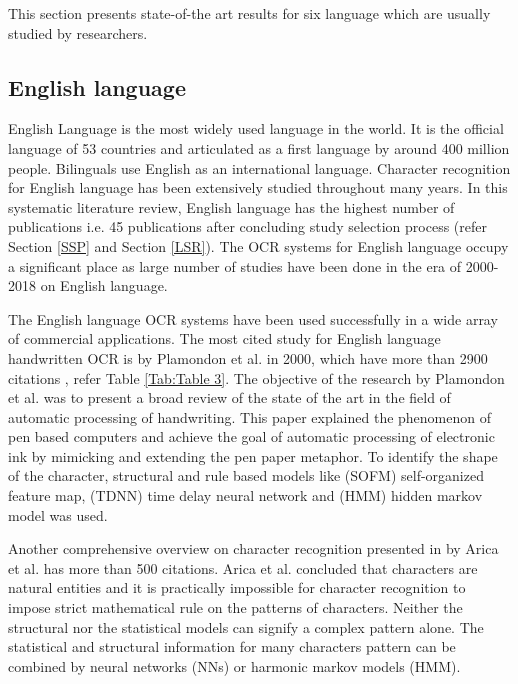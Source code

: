 \documentclass{article}
\begin{document}
This section presents state-of-the art results for six language which are usually studied by researchers. 

 

\subsection{English language}

English Language is the most widely used language in the world. It is the official language of 53 countries and articulated as a first language by around 400 million people. Bilinguals use English as an international language. Character recognition for English language has been extensively studied throughout many years. In this systematic literature review, English language has the highest number of publications i.e. 45 publications after concluding study selection process (refer Section \ref{SSP} and Section \ref{LSR}). The OCR systems for English language occupy a significant place as large number of studies have been done in the era of 2000-2018 on English language.

The English language OCR systems have been used successfully in a wide array of commercial applications. The most cited study for English language handwritten OCR is by Plamondon et al. \cite{plamondon2000online} in 2000, which have more than 2900 citations , refer Table \ref{Tab:Table 3}. The objective of the research by Plamondon et al. was to present a broad review of the state of the art in the field of automatic processing of handwriting. This paper explained the phenomenon of pen based computers and achieve the goal of automatic processing of electronic ink by mimicking and extending the pen paper metaphor. To identify the shape of the character, structural and rule based models like (SOFM) self-organized feature map, (TDNN) time delay neural network and (HMM) hidden markov model was used. 




Another comprehensive overview on character recognition presented in \cite{arica2001overview} by Arica et al. has more than 500 citations. Arica et al. concluded that characters are natural entities and it is  practically impossible for character recognition to impose strict mathematical rule on the patterns of characters. Neither the structural nor the statistical models can signify a complex pattern alone. The statistical and structural information for many characters pattern can be combined by neural networks (NNs) or harmonic markov models (HMM). 
\end{document}
